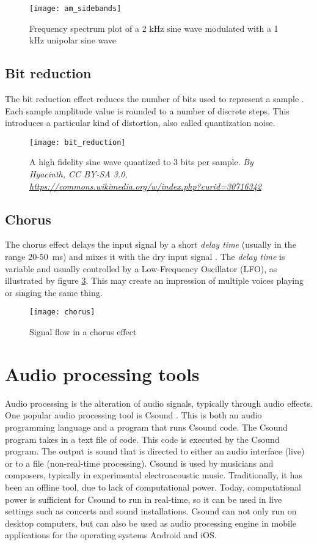 \begin{figure}[H]
    \centering
    \texttt{[image: am\_sidebands]}
    \caption{Frequency spectrum plot of a 2 kHz sine wave modulated with a 1 kHz unipolar sine wave}
    \label{fig:am_sidebands}
\end{figure}

\subsection{Bit reduction}
The bit reduction effect reduces the number of bits used to represent a sample \citep{bitreduction}. Each sample amplitude value is rounded to a number of discrete steps. This introduces a particular kind of distortion, also called quantization noise.

\begin{figure}[H]
    \centering
    \texttt{[image: bit\_reduction]}
    \caption{A high fidelity sine wave quantized to 3 bits per sample. \textit{By Hyacinth, CC BY-SA 3.0, \url{https://commons.wikimedia.org/w/index.php?curid=30716342}}}
    \label{fig:bit_reduction}
\end{figure}

\subsection{Chorus}
The chorus effect delays the input signal by a short \textit{delay time} (usually in the range 20-50~ms) and mixes it with the dry input signal \citep{chorus}. The \textit{delay time} is variable and usually controlled by a Low-Frequency Oscillator (LFO), as illustrated by figure \ref{fig:chorus}. This may create an impression of multiple voices playing or singing the same thing.

\begin{figure}[H]
    \centering
    \texttt{[image: chorus]}
    \caption{Signal flow in a chorus effect}
    \label{fig:chorus}
\end{figure}


\section{Audio processing tools}
Audio processing is the alteration of audio signals, typically through audio effects. One popular audio processing tool is Csound \citep{csound}. This is both an audio programming language and a program that runs Csound code. The Csound program takes in a text file of code. This code is executed by the Csound program. The output is sound that is directed to either an audio interface (live) or to a file (non-real-time processing). Csound is used by musicians and composers, typically in experimental electroacoustic music. Traditionally, it has been an offline tool, due to lack of computational power. Today, computational power is sufficient for Csound to run in real-time, so it can be used in live settings such as concerts and sound installations. Csound can not only run on desktop computers, but can also be used as audio processing engine in mobile applications for the operating systems Android and iOS.

